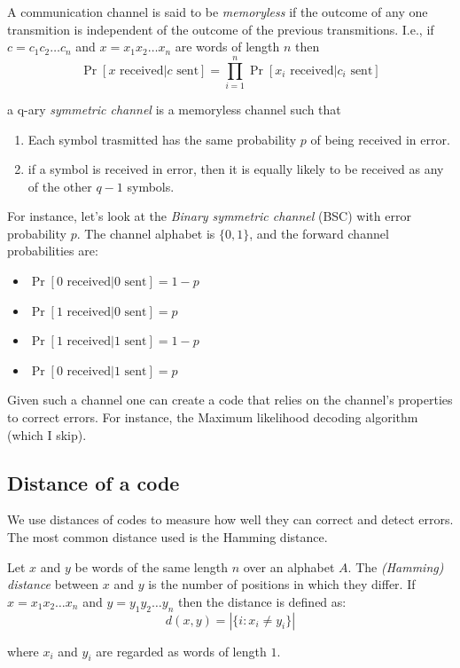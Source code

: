 \begin{definition}
    A communication channel is said to be \emph{memoryless}  if the outcome
    of any one transmition is independent of the outcome of the previous 
    transmitions.
    I.e., if $c=c_1c_2\dots c_n$ and $x=x_1x_2\dots x_n$ are words of length $n$ then 
    $$ \Pr[x \text{ received}| c \text{ sent}] = \prod_{i=1}^n \Pr[x_i \text{ received}| c_i \text{ sent}]$$
\end{definition}

\begin{definition}
a q-ary \emph{symmetric channel} is a memoryless channel such that 
\begin{enumerate}
    \item Each symbol trasmitted has the same probability $p$ of being received in error.
    \item if a symbol is received in error, then it is equally likely 
    to be received as any of the other $q-1$ symbols.
\end{enumerate}
\end{definition}

For instance, let's look at the \emph{Binary symmetric channel} (BSC) 
with error probability $p$.
The channel alphabet is $\{0,1\}$, and the forward channel probabilities are:
\begin{itemize}
\item $ \Pr[0\text{ received}| 0\text{ sent}] = 1-p$
\item $ \Pr[1\text{ received}| 0\text{ sent}] = p$
\item $ \Pr[1\text{ received}| 1\text{ sent}] = 1-p$
\item $ \Pr[0\text{ received}| 1\text{ sent}] = p$
\end{itemize}

Given such a channel one can create a code that relies on the channel's
 properties to correct errors.
For instance, the Maximum likelihood decoding algorithm (which I skip).


\subsection{Distance of a code}

We use distances of codes to measure how well they can correct and detect errors.
The most common distance used is the Hamming distance.

\begin{definition}\label{def:hamming-distance}
    Let $x$ and $y$ be words of the same length $n$ over an alphabet $A$.
    The \emph{(Hamming) distance} between $x$ and $y$ is the number of
     positions in which they differ.
    If $x=x_1x_2\dots x_n$ and $y=y_1y_2\dots y_n$ then the distance is defined as:
    $$ d(x,y) = |\{i: x_i\neq y_i\}|$$

    where $x_i$ and $y_i$ are regarded as words of length $1$.
\end{definition}

